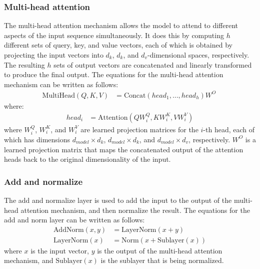 \documentclass[a4paper]{sapthesis}
\begin{document}
\subsubsection{Multi-head attention}
The multi-head attention mechanism allows the model to attend to different
 aspects of the input sequence simultaneously. It does this by 
computing $h$ different sets of query, key, and value vectors,
each of which is obtained by projecting the input vectors into
$d_k$, $d_k$, and $d_v$-dimensional spaces, respectively. 
The resulting $h$ sets of output vectors are concatenated
 and linearly transformed to produce the final output.\newline
 The equations for the multi-head attention mechanism can be written as 
 follows:
 \begin{align*}
 \text{MultiHead}(Q,K,V) &= \text{Concat}(head_1,\ldots,head_h)W^O \
\end{align*}
where:
 \begin{align*}
   head_i &= \text{Attention}(QW_i^Q, KW_i^K, VW_i^V)
 \end{align*}
 where $W_i^Q$, $W_i^K$, and $W_i^V$ are learned projection matrices for
  the $i$-th head, each of which has dimensions $d_{model}\times d_k$,
   $d_{model}\times d_k$, and $d_{model}\times d_v$, respectively.
    $W^O$ is a learned projection matrix that maps the concatenated
 output of the attention heads back to the original dimensionality of
  the input.
\subsubsection{Add and normalize}
The add and normalize layer is used to add the input to the output of the
  multi-head attention mechanism, and then normalize the result. The
    equations for the add and norm layer can be written as follows:
    \begin{align*}
      \text{AddNorm}(x,y) &= \text{LayerNorm}(x+y) \\
      \text{LayerNorm}(x) &= \text{Norm}(x+\text{Sublayer}(x))
      \end{align*}
where $x$ is the input vector, $y$ is the output of the multi-head
  attention mechanism, and $\text{Sublayer}(x)$ is the sublayer that
    is being normalized.
\end{document}
